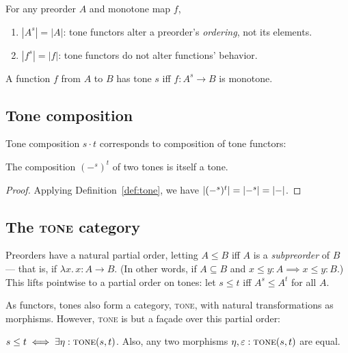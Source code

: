 \documentclass{rntz}
\newcommand{\fn}{\lambda}
\newcommand{\binder}{.\,}
\newcommand{\bind}[1]{{#1}\binder}
\newcommand{\fnof}[1]{\fn\bind{#1}}
\newcommand{\cat}[1]{\textsc{#1}} %
\newcommand{\Tone}{\cat{tone}}
\newcommand{\Cat}{\cat{cat}}
\newcommand{\tc}{\cdot}                      %
\begin{document}
\begin{corollary}
  For any preorder $A$ and monotone map $f$,
  \begin{enumerate}
  \item $|A^s| = |A|$: tone functors alter a preorder's \emph{ordering}, not its
    elements.
  \item $|f^s| = |f|$: tone functors do not alter functions' behavior.
  \end{enumerate}
\end{corollary}

\begin{definition}
  A function $f$ from $A$ to $B$ has tone $s$ iff $f : A^s \to B$ is monotone.
\end{definition}


\subsection{Tone composition}

Tone composition $s \tc t$ corresponds to composition of tone functors:

\begin{theorem}
  The composition $(-^s)^t$ of two tones is itself a tone.
\end{theorem}

\begin{proof} Applying Definition~\ref{def:tone}, we have
  \( |{(-^s)^t}| = |{-^s}| = |{-}| \).
\end{proof}


\subsection{The \Tone{} category}

Preorders have a natural partial order, letting $A \le B$ iff $A$ is a
\emph{subpreorder} of $B$ --- that is, if $\fnof{x} x : A \to B$. (In other
words, if $A \subseteq B$ and $x \le y : A \implies x \le y : B$.)
%
This lifts pointwise to a partial order on tones: let $s \le t$ iff $A^s \le
A^t$ for all $A$.

As functors, tones also form a category, \Tone{}, with natural transformations
as morphisms. However, \Tone{} is but a fa\c{c}ade over this partial order:

\begin{theorem}\label{thm:tone-poset}
  $s \le t \iff \exists \eta : \Tone(s, t)$. Also, any two morphisms $\eta,
  \varepsilon : \Tone(s,t)$ are equal.
\end{theorem}
\end{document}
